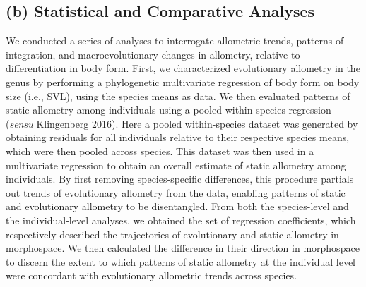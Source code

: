 \documentclass[
  11pt,
]{article}
\begin{document}
\hypertarget{b-statistical-and-comparative-analyses}{%
\subsection{(b) Statistical and Comparative
Analyses}\label{b-statistical-and-comparative-analyses}}

We conducted a series of analyses to interrogate allometric trends,
patterns of integration, and macroevolutionary changes in allometry,
relative to differentiation in body form. First, we characterized
evolutionary allometry in the genus by performing a phylogenetic
multivariate regression of body form on body size (i.e., SVL), using the
species means as data. We then evaluated patterns of static allometry
among individuals using a pooled within-species regression (\emph{sensu}
Klingenberg 2016). Here a pooled within-species dataset was generated by
obtaining residuals for all individuals relative to their respective
species means, which were then pooled across species. This dataset was
then used in a multivariate regression to obtain an overall estimate of
static allometry among individuals. By first removing species-specific
differences, this procedure partials out trends of evolutionary
allometry from the data, enabling patterns of static and evolutionary
allometry to be disentangled. From both the species-level and the
individual-level analyses, we obtained the set of regression
coefficients, which respectively described the trajectories of
evolutionary and static allometry in morphospace. We then calculated the
difference in their direction in morphospace to discern the extent to
which patterns of static allometry at the individual level were
concordant with evolutionary allometric trends across species.
\hfill\break
\end{document}
